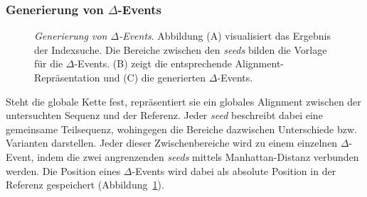 \documentclass[12pt]{article}
\begin{document}
\subsubsection{Generierung von $\Delta$-Events}

\begin{figure}[t]
\caption{\label{fig:deltaevent}\footnotesize \emph{Generierung von $\Delta$-Events}. Abbildung (A) visualisiert das Ergebnis der Indexsuche. Die Bereiche zwischen den \textit{seeds} bilden die Vorlage für die $\Delta$-Events. (B) zeigt die entsprechende Alignment-Repräsentation und (C) die generierten $\Delta$-Events.  }
\end{figure}

Steht die globale Kette fest, repräsentiert sie ein globales Alignment zwischen der untersuchten Sequenz und der Referenz. Jeder \textit{seed} beschreibt dabei eine gemeinsame Teilsequenz, wohingegen die Bereiche dazwischen Unterschiede bzw. Varianten darstellen. Jeder dieser Zwischenbereiche wird zu einem einzelnen $\Delta$-Event, indem die zwei angrenzenden \textit{seeds} mittels Manhattan-Distanz verbunden werden. Die Position eines $\Delta$-Events wird dabei als absolute Position in der Referenz gespeichert (Abbildung~\ref{fig:deltaevent}).
\end{document}
